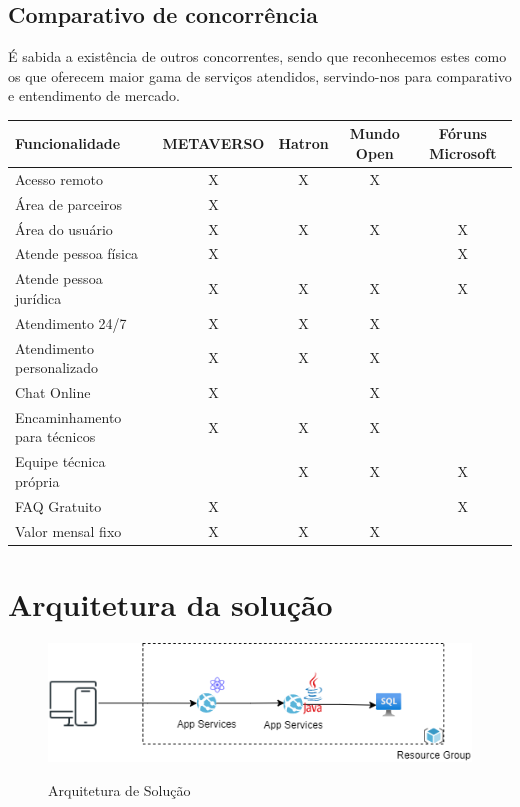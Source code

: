 \documentclass[
    12pt,               %
    openright,          %
    oneside,
    a4paper,            %
    MODELO,             %
    english,            %
    brazil              %
   ]{ifsp-spo-inf-ctds}
\begin{document}
    
    \section{Comparativo de concorrência}
    É sabida a existência de outros concorrentes, sendo que reconhecemos estes como os que oferecem maior gama de serviços atendidos, servindo-nos para comparativo e entendimento de mercado.
    
    \begin{table}
        \begin{tabular}{l c c c c}
            \hline
            Funcionalidade          & METAVERSO & Hatron & Mundo Open & Fóruns Microsoft \\
            \hline
            Acesso remoto           & X       & X   & X &   \\
            Área de parceiros   & X   &     &   &   \\
            Área do usuário & X & X & X & X\\
            Atende pessoa física & X &   &   & X\\
            Atende pessoa jurídica & X & X & X & X\\
            Atendimento 24/7 & X & X & X &  \\
            Atendimento personalizado & X & X & X &  \\
            Chat Online & X &   & X &  \\
            Encaminhamento para técnicos & X & X & X &  \\
            Equipe técnica própria &   & X & X & X\\
            FAQ Gratuito & X &   &   & X\\
            Valor mensal fixo & X & X & X &  \\
            \hline

        \end{tabular}
    \end{table}

\chapter[Arquitetura da solução]{Arquitetura da solução}

\begin{figure}[h]
\caption{Arquitetura de Solução}

\centering %
\includegraphics[width=15cm]{anexos/arquitetura_v1.png} %
\label{figura:desenhodearquitetura}
\end{figure}
\end{document}
